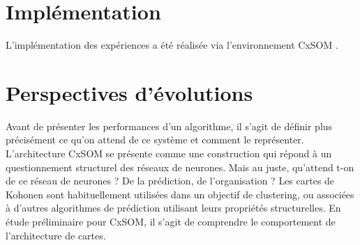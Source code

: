 \section{Implémentation}

L'implémentation des expériences a été réalisée via l'environnement CxSOM \cite{cxsom}.

\section{Perspectives d'évolutions}


Avant de présenter les performances d'un algorithme, il s'agit de définir plus précisément ce qu'on attend de ce système et comment le représenter. L'architecture CxSOM se présente comme une construction qui répond à un questionnement structurel des réseaux de neurones. Mais au juste, qu'attend t-on de ce réseau de neurones ? De la prédiction, de l'organisation ? Les cartes de Kohonen sont habituellement utilisées dans un objectif de clustering, ou associées à d'autres algorithmes de prédiction utilisant leurs propriétés structurelles. En étude préliminaire pour CxSOM, il s'agit de comprendre le comportement de l'architecture de cartes.

